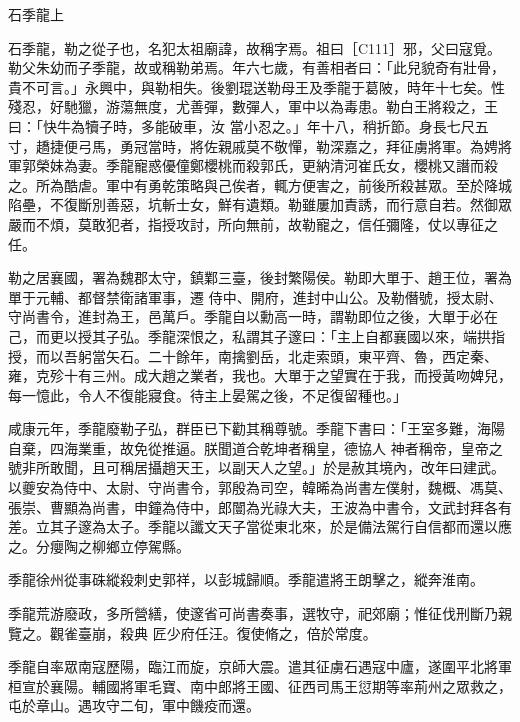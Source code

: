 
\begin{pinyinscope}

 石季龍上



 石季龍，勒之從子也，名犯太祖廟諱，故稱字焉。祖曰［C111］邪，父曰寇覓。勒父朱幼而子季龍，故或稱勒弟焉。年六七歲，有善相者曰：「此兒貌奇有壯骨，貴不可言。」永興中，與勒相失。後劉琨送勒母王及季龍于葛陂，時年十七矣。性殘忍，好馳獵，游蕩無度，尤善彈，數彈人，軍中以為毒患。勒白王將殺之，王曰：「快牛為犢子時，多能破車，汝
 當小忍之。」年十八，稍折節。身長七尺五寸，趫捷便弓馬，勇冠當時，將佐親戚莫不敬憚，勒深嘉之，拜征虜將軍。為娉將軍郭榮妹為妻。季龍寵惑優僮鄭櫻桃而殺郭氏，更納清河崔氏女，櫻桃又譖而殺之。所為酷虐。軍中有勇乾策略與己俟者，輒方便害之，前後所殺甚眾。至於降城陷壘，不復斷別善惡，坑斬士女，鮮有遺類。勒雖屢加責誘，而行意自若。然御眾嚴而不煩，莫敢犯者，指授攻討，所向無前，故勒寵之，信任彌隆，仗以專征之任。



 勒之居襄國，署為魏郡太守，鎮鄴三臺，後封繁陽侯。勒即大單于、趙王位，署為單于元輔、都督禁衛諸軍事，遷
 侍中、開府，進封中山公。及勒僭號，授太尉、守尚書令，進封為王，邑萬戶。季龍自以勳高一時，謂勒即位之後，大單于必在己，而更以授其子弘。季龍深恨之，私謂其子邃曰：「主上自都襄國以來，端拱指授，而以吾躬當矢石。二十餘年，南擒劉岳，北走索頭，東平齊、魯，西定秦、雍，克殄十有三州。成大趙之業者，我也。大單于之望實在于我，而授黃吻婢兒，每一憶此，令人不復能寢食。待主上晏駕之後，不足復留種也。」



 咸康元年，季龍廢勒子弘，群臣已下勸其稱尊號。季龍下書曰：「王室多難，海陽自棄，四海業重，故免從推逼。朕聞道合乾坤者稱皇，德協人
 神者稱帝，皇帝之號非所敢聞，且可稱居攝趙天王，以副天人之望。」於是赦其境內，改年曰建武。以夔安為侍中、太尉、守尚書令，郭殷為司空，韓晞為尚書左僕射，魏概、馮莫、張崇、曹顯為尚書，申鐘為侍中，郎闓為光祿大夫，王波為中書令，文武封拜各有差。立其子邃為太子。季龍以讖文天子當從東北來，於是備法駕行自信都而還以應之。分癭陶之柳鄉立停駕縣。



 季龍徐州從事硃縱殺刺史郭祥，以彭城歸順。季龍遣將王朗擊之，縱奔淮南。



 季龍荒游廢政，多所營繕，使邃省可尚書奏事，選牧守，祀郊廟；惟征伐刑斷乃親覽之。觀雀臺崩，殺典
 匠少府任汪。復使脩之，倍於常度。



 季龍自率眾南寇歷陽，臨江而旋，京師大震。遣其征虜石遇寇中廬，遂圍平北將軍桓宣於襄陽。輔國將軍毛寶、南中郎將王國、征西司馬王愆期等率荊州之眾救之，屯於章山。遇攻守二旬，軍中饑疫而還。




\end{pinyinscope}
